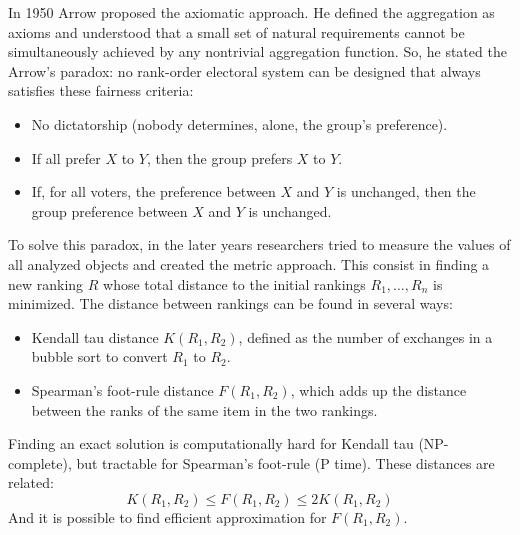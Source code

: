 \documentclass[12pt, a4paper]{report}
\newtheorem[style=M,bodystyle=\normalfont]{theorem}{Theorem}
\newtheorem[style=M,bodystyle=\normalfont]{corollary}{Corollary}
\newtheorem[style=M,bodystyle=\normalfont]{lemma}{Lemma}
\newtheorem[style=M,bodystyle=\normalfont]{definition}{Definition}
\begin{document}
    In 1950 Arrow proposed the axiomatic approach. He defined the aggregation as axioms and understood that a small set of natural requirements cannot be simultaneously achieved by 
    any nontrivial aggregation function. So, he stated the Arrow's paradox: no rank-order electoral system can be designed that always satisfies these fairness criteria:
    \begin{itemize}
        \item No dictatorship (nobody determines, alone, the group's preference). 
        \item If all prefer $X$ to $Y$, then the group prefers $X$ to $Y$. 
        \item If, for all voters, the preference between $X$ and $Y$ is unchanged, then the group preference between $X$ and $Y$ is unchanged. 
    \end{itemize}

    To solve this paradox, in the later years researchers tried to measure the values of all analyzed objects and created the metric approach. This consist in finding a new ranking 
    $R$ whose total distance to the initial rankings $R_1,\dots,R_n$ is minimized. The distance between rankings can be found in several ways: 
    \begin{itemize}
        \item Kendall tau distance $K(R_1, R_2)$, defined as the number of exchanges in a bubble sort to convert $R_1$ to $R_2$. 
        \item Spearman's foot-rule distance $F(R_1, R_2)$, which adds up the distance between the ranks of the same item in the two rankings. 
    \end{itemize}
    Finding an exact solution is computationally hard for Kendall tau (NP-complete), but tractable for Spearman's foot-rule (P time). These distances are related:
    \[K(R_1, R_2) \leq F(R_1, R_2) \leq 2K(R_1, R_2)\]
    And it is possible to find efficient approximation for $F(R_1, R_2)$. 
\end{document}

